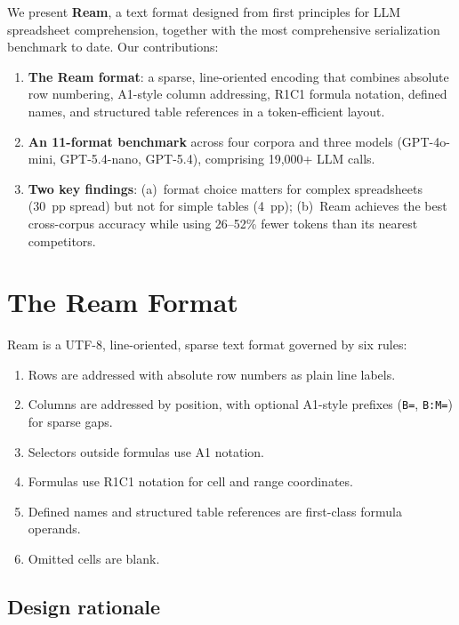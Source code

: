 \documentclass[11pt]{article}
\begin{document}
We present \textbf{Ream}, a text format designed from first principles for LLM spreadsheet comprehension, together with the most comprehensive serialization benchmark to date.
Our contributions:

\begin{enumerate}[nosep]
    \item \textbf{The Ream format}: a sparse, line-oriented encoding that combines absolute row numbering, A1-style column addressing, R1C1 formula notation, defined names, and structured table references in a token-efficient layout.
    \item \textbf{An 11-format benchmark} across four corpora and three models (GPT-4o-mini, GPT-5.4-nano, GPT-5.4), comprising 19,000+ LLM calls.
    \item \textbf{Two key findings}: (a)~format choice matters for complex spreadsheets (30~pp spread) but not for simple tables (4~pp); (b)~Ream achieves the best cross-corpus accuracy while using 26--52\% fewer tokens than its nearest competitors.
\end{enumerate}

\section{The Ream Format}
\label{sec:ream}

Ream is a UTF-8, line-oriented, sparse text format governed by six rules:

\begin{enumerate}[nosep]
    \item Rows are addressed with absolute row numbers as plain line labels.
    \item Columns are addressed by position, with optional A1-style prefixes (\texttt{B=}, \texttt{B:M=}) for sparse gaps.
    \item Selectors outside formulas use A1 notation.
    \item Formulas use R1C1 notation for cell and range coordinates.
    \item Defined names and structured table references are first-class formula operands.
    \item Omitted cells are blank.
\end{enumerate}

\subsection{Design rationale}
\end{document}
